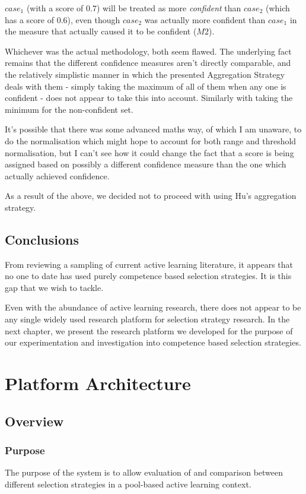 \documentclass[a4paper,11pt]{report}
\begin{document}
\begin{enumerate}
	$case_{1}$ (with a score of $0.7$) will be treated as more \emph{confident} than $case_{2}$ (which has a score of $0.6$), even though $case_{2}$ was actually more confident than $case_{1}$ in the measure that actually caused it to be confident ($M2$).
	
\end{enumerate}

Whichever was the actual methodology, both seem flawed. The underlying fact remains that the different confidence measures aren't directly comparable, and the relatively simplistic manner in which the presented Aggregation Strategy deals with them - simply taking the maximum of all of them when any one is confident - does not appear to take this into account. Similarly with taking the minimum for the non-confident set.

It's possible that there was some advanced maths way, of which I am unaware, to do the normalisation which might hope to account for both range and threshold normalisation, but I can't see how it could change the fact that a score is being assigned based on possibly a different confidence measure than the one which actually achieved confidence.

As a result of the above, we decided not to proceed with using Hu's aggregation strategy.

\section{Conclusions}
From reviewing a sampling of current active learning literature, it appears that no one to date has used purely competence based selection strategies. It is this gap that we wish to tackle. 

Even with the abundance of active learning research, there does not appear to be any single widely used research platform for selection strategy research. In the next chapter, we present the research platform we developed for the purpose of our experimentation and investigation into competence based selection strategies.

\chapter{Platform Architecture\label{cha:platarch}}
\section{Overview}
\subsection{Purpose}
The purpose of the system is to allow evaluation of and comparison between different selection strategies in a pool-based active learning context.
\end{document}
